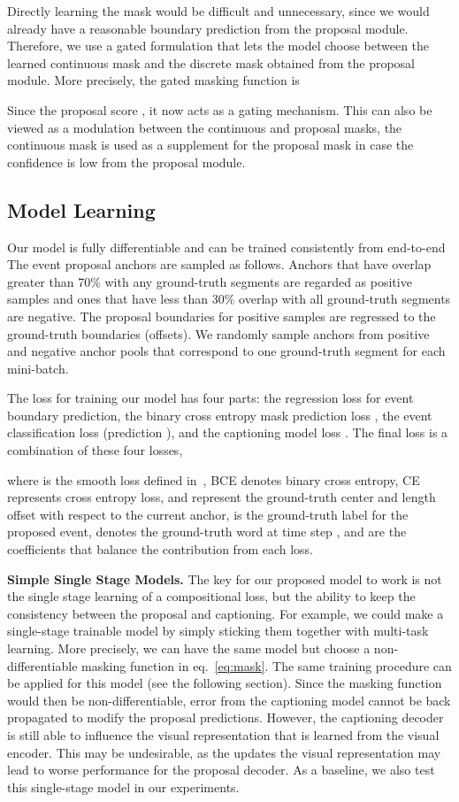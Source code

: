 \documentclass[10pt,twocolumn,letterpaper]{article}
\begin{document}
Directly learning the mask would be difficult and unnecessary, since we would already have a reasonable boundary prediction from the proposal module. Therefore, we use a gated formulation that lets the model choose between the learned continuous mask and the discrete mask obtained from the proposal module. More precisely, the gated masking function  is

Since the proposal score , it now acts as a gating mechanism. This can also be viewed as a modulation between the continuous and proposal masks, the continuous mask is used as a supplement for the proposal mask in case the confidence is low from the proposal module.

\subsection{Model Learning}
\label{sec:learning}
Our model is fully differentiable and can be trained consistently from end-to-end
The event proposal anchors are sampled as follows. Anchors that have overlap greater than 70\% with any ground-truth segments are regarded as positive samples and ones that have less than 30\% overlap with all ground-truth segments are negative. The proposal boundaries for positive samples are regressed to the ground-truth boundaries (offsets). We randomly sample  anchors from positive and negative anchor pools that correspond to one ground-truth segment for each mini-batch.

The loss for training our model has four parts: the regression loss  for event boundary prediction, the binary cross entropy mask prediction loss ,  the event classification loss  (\ie prediction ), and the captioning model loss . The final loss  is a combination of these four losses,

where  is the smooth  loss defined in~\cite{girshick2015fast}, BCE denotes binary cross entropy, CE represents cross entropy loss,  and  represent the ground-truth center and length offset with respect to the current anchor,  is the ground-truth label for the proposed event,  denotes the ground-truth word at time step , and  are the coefficients that balance the contribution from each loss. 

\noindent\textbf{Simple Single Stage Models.}\quad
The key for our proposed model to work is not the single stage learning of a compositional loss, but the ability to keep the consistency between the proposal and captioning. For example, we could make a single-stage trainable model by simply sticking them together with multi-task learning. More precisely, we can have the same model but choose a non-differentiable masking function  in eq.~\ref{eq:mask}. The same training procedure can be applied for this model (see the following section).
Since the masking function would then be non-differentiable, error from the captioning model cannot be back propagated to modify the proposal predictions. However, the captioning decoder is still able to influence the visual representation that is learned from the visual encoder. This may be undesirable, as the updates the visual representation may lead to worse performance for the proposal decoder. As a baseline, we also test this single-stage model in our experiments.
\end{document}
